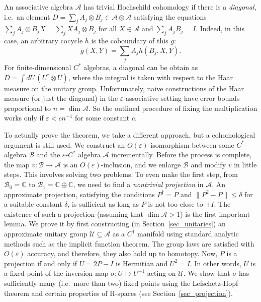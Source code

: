 \documentclass[12pt]{article}
\newcommand{\CC}{\mathbb{C}}
\newcommand{\calA}{\mathcal{A}}
\newcommand{\calB}{\mathcal{B}}
\newcommand{\calU}{\mathcal{U}}
\newcommand{\eps}{\varepsilon}
\renewcommand{\le}{\leqslant}
\newtheorem[definition]{Definition}[Theorem]{Definition}
\newtheorem[remark]{Example}[Theorem]{Example}
\newtheorem[remark]{Remark}[Theorem]{Remark}
\newtheorem[remark]{Question}[Theorem]{Open question}
\newtheorem*[definition]{definition}{Definition}
\newtheorem*[remark]{example}{Example}
\newtheorem*[remark]{remark}{Remark}
\newtheorem*[remark]{question}{Open question}
\numberwithin{equation}{section}
\begin{document}
An associative algebra $\calA$ has trivial Hochschild cohomology if there is a \emph{diagonal}, i.e.\ an element $D=\sum_{j}A_j\otimes B_j\in\calA\otimes\calA$ satisfying the equations $\sum_{j}A_j\otimes B_jX=\sum_{j}XA_j\otimes B_j$ for all $X\in\calA$ and $\sum_{j}A_jB_j=I$. Indeed, in this case, an arbitrary cocycle $h$ is the coboundary of this $g$:
\begin{equation}
g(X,Y)=\sum_j A_{j}h(B_j,X,Y).
\end{equation}
For finite-dimensional $C^*$ algebras, a diagonal can be obtain as $D=\int dU\, (U^\dag\otimes U)$, where the integral is taken with respect to the Haar measure on the unitary group. Unfortunately, naive constructions of the Haar measure (or just the diagonal) in the $\eps$-associative setting have error bounds proportional to $n=\dim\calA$. So the outlined procedure of fixing the multiplication works only if $\eps<cn^{-1}$ for some constant $c$.

To actually prove the theorem, we take a different approach, but a cohomological argument is still used. We construct an $O(\eps)$-isomorphism between some $C^*$ algebra $\calB$ and the $\eps$-$C^*$ algebra $\calA$ incrementally. Before the process is complete, the map $v\colon \calB\to\calA$ is an $O(\eps)$-inclusion, and we enlarge $\calB$ and modify $v$ in little steps. This involves solving two problems. To even make the first step, from $\calB_0=\CC$ to $\calB_1=\CC\oplus\CC$, we need to find a \emph{nontrivial projection} in $\calA$. An approximate projection, satisfying the conditions $P^\dag=P$ and $\|P^2-P\|\le\delta$ for a suitable constant $\delta$, is sufficient as long as $P$ is not too close to $\pm I$. The existence of such a projection (assuming that $\dim\calA>1$) is the first important lemma. We prove it by first constructing (in Section~\ref{sec_unitaries}) an approximate unitary group $\calU\subseteq\calA$ as a $C^1$ manifold using standard analytic methods such as the implicit function theorem. The group laws are satisfied with $O(\eps)$ accuracy, and therefore, they also hold up to homotopy. Now, $P$ is a projection if and only if $U=2P-I$ is Hermitian and $U^2=I$. In other words, $U$ is a fixed point of the inversion map $\sigma\colon U\mapsto U^{-1}$ acting on $\calU$. We show that $\sigma$ has sufficiently many (i.e.\ more than two) fixed points using the Lefschetz-Hopf theorem and certain properties of H-spaces (see Section~\ref{sec_projection}).
\end{document}
